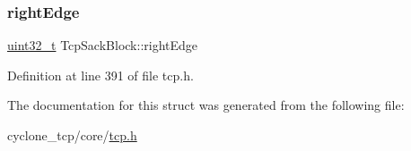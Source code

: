 \mbox{\label{structTcpSackBlock_aa2eb00a549d96b0ccf7d49a164df50ff}} 
\subsubsection{\texorpdfstring{right\+Edge}{rightEdge}}
{\footnotesize\ttfamily \hyperlink{stdint_8h_a435d1572bf3f880d55459d9805097f62}{uint32\+\_\+t} Tcp\+Sack\+Block\+::right\+Edge}



Definition at line 391 of file tcp.\+h.



The documentation for this struct was generated from the following file\+:\begin{DoxyCompactItemize}
\item 
cyclone\+\_\+tcp/core/\hyperlink{tcp_8h}{tcp.\+h}\end{DoxyCompactItemize}
